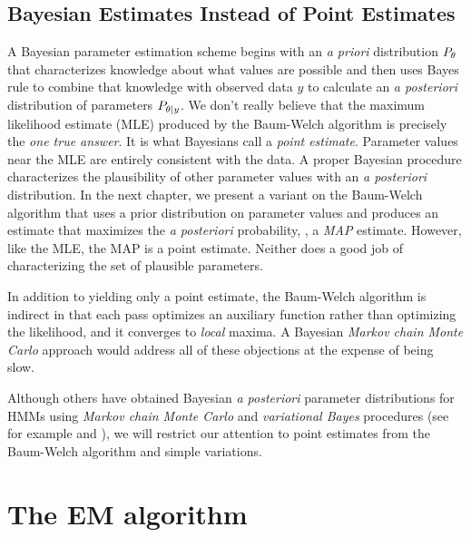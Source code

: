 \subsection{Bayesian Estimates Instead of Point Estimates}
\label{sec:EstWholeDist}

A Bayesian parameter estimation scheme begins with an \emph{a priori}
distribution $P_{\theta}$ that characterizes knowledge about what
values are possible and then uses Bayes rule to combine that knowledge
with observed data $y$ to calculate an \emph{a posteriori}
distribution of parameters $P_{\theta|y}$.  We don't really
believe that the maximum likelihood estimate (MLE) produced by the
Baum-Welch algorithm is precisely the \emph{one true answer}.  It is
what Bayesians call a \emph{point estimate}.  Parameter values near
the MLE are entirely consistent with the data.  A proper Bayesian
procedure characterizes the plausibility of other parameter values
with an \emph{a posteriori} distribution.  In the next chapter, we
present a variant on the Baum-Welch algorithm that uses a prior
distribution on parameter values and produces an estimate that
maximizes the \emph{a posteriori} probability, \ie, a \emph{MAP}
estimate.  However, like the MLE, the MAP is a point estimate.
Neither does a good job of characterizing the set of plausible
parameters.

In addition to yielding only a point estimate, the Baum-Welch
algorithm is indirect in that each pass optimizes an auxiliary
function rather than optimizing the likelihood, and it converges to
\emph{local} maxima.  A Bayesian \emph{Markov chain Monte Carlo}
approach would address all of these objections at the expense of being
slow.

Although others have obtained Bayesian \emph{a posteriori} parameter
distributions for HMMs using \emph{Markov chain Monte Carlo} and
\emph{variational Bayes} procedures (see for example \cite{Rosales04}
and \cite{Beal03}), we will restrict our attention to point estimates
from the Baum-Welch algorithm and simple variations.


\section{The EM algorithm}
\label{sec:EM}
%
%

